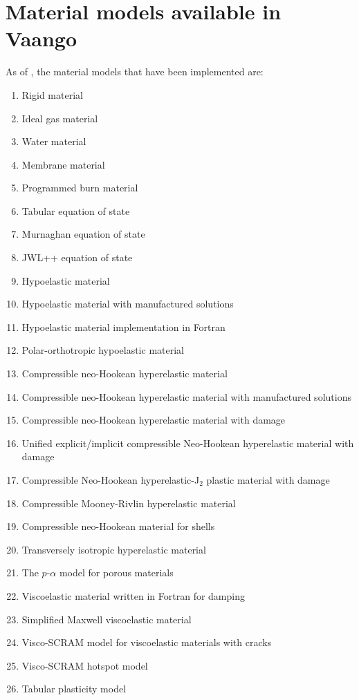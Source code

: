 \section{Material models available in Vaango}
As of \Vaango \version, the material models that have been implemented are:
\begin{enumerate}
  \item Rigid material
  \item Ideal gas material
  \item Water material
  \item Membrane material
  \item Programmed burn material
  \item Tabular equation of state
  \item Murnaghan equation of state
  \item JWL++ equation of state
  \item Hypoelastic material
  \item Hypoelastic material with manufactured solutions
  \item Hypoelastic material implementation in Fortran
  \item Polar-orthotropic hypoelastic material
  \item Compressible neo-Hookean hyperelastic material
  \item Compressible neo-Hookean hyperelastic material with manufactured solutions
  \item Compressible neo-Hookean hyperelastic material with damage
  \item Unified explicit/implicit compressible Neo-Hookean hyperelastic material with damage
  \item Compressible Neo-Hookean hyperelastic-J$_2$ plastic material with damage
  \item Compressible Mooney-Rivlin hyperelastic material
  \item Compressible neo-Hookean material for shells
  \item Transversely isotropic hyperelastic material
  \item The $p$-$\alpha$ model for porous materials
  \item Viscoelastic material written in Fortran for damping
  \item Simplified Maxwell viscoelastic material
  \item Visco-SCRAM model for viscoelastic materials with cracks
  \item Visco-SCRAM hotspot model
  \item Tabular plasticity model

\end{enumerate}
